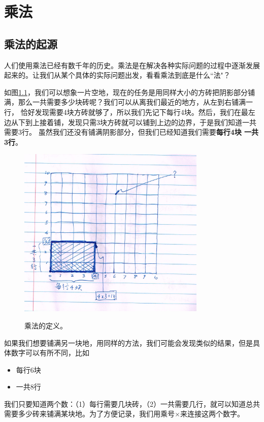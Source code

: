 \chapter{乘法}

\section{乘法的起源}
人们使用乘法已经有数千年的历史。乘法是在解决各种实际问题的过程中逐渐发展起来的。让我们从某个具体的实际问题出发，看看乘法到底是什么``法"？

如图\ref{img_multiplication}，我们可以想象一片空地，现在的任务是用同样大小的方砖把阴影部分铺满，那么一共需要多少块砖呢？我们可以从离我们最近的地方，从左到右铺满一行， 恰好发现需要4块方砖就够了，所以我们先记下每行4块。然后，我们在最左边从下到上接着铺，发现只需3块方砖就可以铺到上边的边界，于是我们知道一共需要3行。 虽然我们还没有铺满阴影部分，但我们已经知道我们需要\textbf{每行4块 一共3行}。

\begin{figure}[h]
    \center
    \includegraphics[width=0.8\textwidth]{multiplication_res/multiplication_definition}\label{img_multiplication}
    \caption{乘法的定义。}
\end{figure}


如果我们想要铺满另一块地，用同样的方法，我们可能会发现类似的结果，但是具体数字可以有所不同，比如
\begin{itemize}
    \item 每行6块
    \item 一共8行
\end{itemize}
我们只要知道两个数：（1）每行需要几块砖，（2）一共需要几行，就可以知道总共需要多少砖来铺满某块地。为了方便记录，我们用乘号$\times$来连接这两个数字。

